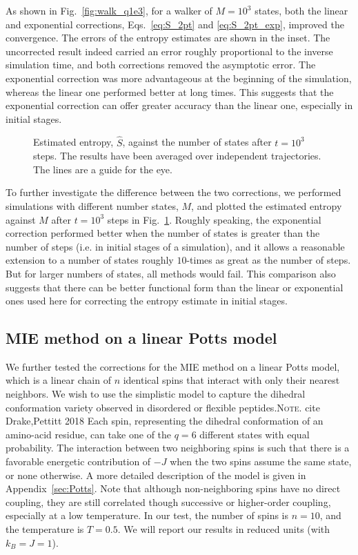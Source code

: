 \documentclass[reprint, superscriptaddress]{revtex4-1}
\newcommand{\note}[1]{{\color{DarkGreen}\footnotesize \textsc{Note.} #1}}
\begin{document}
As shown in Fig.~\ref{fig:walk_q1e3}, for a walker of $M = 10^3$ states,
both the linear and exponential corrections,
Eqs.~\eqref{eq:S_2pt} and \eqref{eq:S_2pt_exp},
improved the convergence.
%
The errors of the entropy estimates are shown in the inset.
%
The uncorrected result
indeed carried an error roughly proportional to the inverse simulation time,
and both corrections removed the asymptotic error.
%
The exponential correction was more advantageous
at the beginning of the simulation,
whereas the linear one performed better at long times.
%
This suggests that the exponential correction
can offer greater accuracy than the linear one,
especially in initial stages.


\begin{figure}[h]\centering
  \caption{
    \label{fig:walk_Svsq}
    Estimated entropy, $\hat S$,
    against the number of states
    after $t = 10^3$ steps.
    The results have been averaged over independent trajectories.
    The lines are a guide for the eye.
  }
\end{figure}

To further investigate the difference between the two corrections,
we performed simulations with different number states, $M$,
and plotted the estimated entropy against $M$
after $t = 10^3$ steps in Fig.~\ref{fig:walk_Svsq}.
%
Roughly speaking, the exponential correction performed better
when the number of states is greater than the number of steps
(i.e. in initial stages of a simulation),
and it allows a reasonable extension to
a number of states roughly $10$-times as great as the number of steps.
%
But for larger numbers of states, all methods would fail.
%
This comparison also suggests that there can be
better functional form than the linear or exponential ones used here
for correcting the entropy estimate in initial stages.



\subsection{MIE method on a linear Potts model}

We further tested the corrections for the MIE method
on a linear Potts model,
which is a linear chain of $n$ identical spins
that interact with only their nearest neighbors.
%
We wish to use the simplistic model
to capture the dihedral conformation variety
observed in disordered or flexible peptides.\note{cite Drake,Pettitt 2018}
%
Each spin, representing the dihedral conformation of an amino-acid residue,
can take one of the $q = 6$ different states with equal probability.
%
The interaction between two neighboring spins
is such that there is a favorable energetic contribution of $-J$
when the two spins assume the same state, or none otherwise.
%
A more detailed description of the model is given in Appendix~\ref{sec:Potts}.
%
Note that although non-neighboring spins have no direct coupling,
they are still correlated though successive or higher-order coupling,
especially at a low temperature.
%
In our test, the number of spins is $n=10$,
and the temperature is $T = 0.5$.
%
We will report our results in reduced units (with $k_B = J = 1$).
\end{document}
